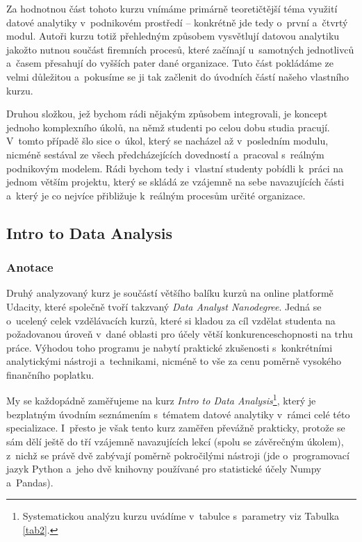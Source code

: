 Za hodnotnou část tohoto kurzu vnímáme primárně teoretičtější téma využití datové analytiky v~podnikovém prostředí -- konkrétně jde tedy o~první a~čtvrtý modul. Autoři kurzu totiž přehledným způsobem vysvětlují datovou analytiku jakožto nutnou součást firemních procesů, které začínají u~samotných jednotlivců a~časem přesahují do vyšších pater dané organizace. Tuto část pokládáme ze velmi důležitou a~pokusíme se ji tak začlenit do úvodních částí našeho vlastního kurzu.

Druhou složkou, jež bychom rádi nějakým způsobem integrovali, je koncept jednoho komplexního úkolů, na němž studenti po celou dobu studia pracují. V~tomto případě šlo sice o~úkol, který se nacházel až v~posledním modulu, nicméně sestával ze všech předcházejících dovedností a~pracoval s~reálným podnikovým modelem. Rádi bychom tedy i~vlastní studenty pobídli k~práci na jednom větším projektu, který se skládá ze vzájemně na sebe navazujících části a~který je co nejvíce přibližuje k~reálným procesům určité organizace.

\hypertarget{intro-to-data-analysis}{%
\subsection{Intro to Data Analysis}\label{intro-to-data-analysis}}

\hypertarget{anotace-1}{%
\subsubsection{Anotace}\label{anotace-1}}

Druhý analyzovaný kurz je součástí většího balíku kurzů na online platformě Udacity, které společně tvoří takzvaný \emph{Data Analyst Nanodegree}. Jedná se o~ucelený celek vzdělávacích kurzů, které si kladou za cíl vzdělat studenta na požadovanou úroveň v~dané oblasti pro účely větší konkurenceschopnosti na trhu práce. Výhodou toho programu je nabytí praktické zkušenosti s~konkrétními analytickými nástroji a~technikami, nicméně to vše za cenu poměrně vysokého finančního poplatku.

My se každopádně zaměřujeme na kurz \emph{Intro to Data Analysis}\footnote{Systematickou analýzu kurzu uvádíme v~tabulce s~parametry viz Tabulka \ref{tab2}.}, který je bezplatným úvodním seznámením s~tématem datové analytiky v~rámci celé této specializace. I~přesto je však tento kurz zaměřen převážně prakticky, protože se sám dělí ještě do tří vzájemně navazujících lekcí (spolu se závěrečným úkolem), z~nichž se právě dvě zabývají poměrně pokročilými nástroji (jde o~programovací jazyk Python a~jeho dvě knihovny používané pro statistické účely Numpy a~Pandas).

